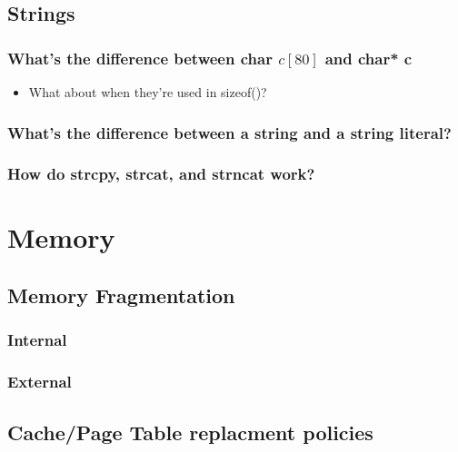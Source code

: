 \documentclass[11pt]{article}
\begin{document}
\subsection{Strings}
\label{sec-4.4}

\subsubsection{What's the difference between char $c[ 80 ]$ and char* c}
\label{sec-4.4.1}

\begin{itemize}

\item What about when they're used in sizeof()?\\
\label{sec-4.4.1.1}

\end{itemize} %
\subsubsection{What's the difference between a string and a string literal?}
\label{sec-4.4.2}

\subsubsection{How do strcpy, strcat, and strncat work?}
\label{sec-4.4.3}

\section{Memory}
\label{sec-5}

\subsection{Memory Fragmentation}
\label{sec-5.1}

\subsubsection{Internal}
\label{sec-5.1.1}

\subsubsection{External}
\label{sec-5.1.2}

\subsection{Cache/Page Table replacment policies}
\label{sec-5.2}
\end{document}
